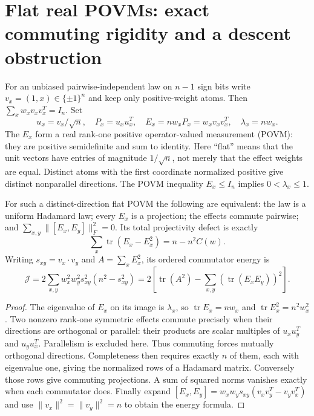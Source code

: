 \section{Flat real POVMs: exact commuting rigidity and a descent obstruction}
For an unbiased pairwise-independent law on $n-1$ sign bits write
$v_x=(1,x)\in\{\pm1\}^n$ and keep only positive-weight atoms.
Then $\sum_xw_xv_xv_x^T=I_n$. Set
\[
 u_x=v_x/\sqrt n,\quad P_x=u_xu_x^T,\quad
 E_x=nw_xP_x=w_xv_xv_x^T,\quad\lambda_x=nw_x.
\]
The $E_x$ form a real rank-one positive operator-valued measurement
(POVM): they are positive semidefinite and sum to identity.
Here ``flat'' means that the unit vectors have entries of magnitude
$1/\sqrt n$, not merely that the effect weights are equal.
Distinct atoms with the first coordinate normalized positive give
distinct nonparallel directions. The POVM inequality $E_x\le I_n$
implies $0<\lambda_x\le1$.

\begin{theorem}
For such a distinct-direction flat POVM the following are equivalent:
the law is a uniform Hadamard law; every $E_x$ is a projection;
the effects commute pairwise; and
$\sum_{x,y}\|[E_x,E_y]\|_F^2=0$.
Its total projectivity defect is exactly
\[
 \sum_x\operatorname{tr}(E_x-E_x^2)=n-n^2C(w).
\]
Writing $s_{xy}=v_x\cdot v_y$ and $A=\sum_xE_x^2$, its ordered
commutator energy is
\[
 \mathcal J=2\sum_{x,y}w_x^2w_y^2s_{xy}^2(n^2-s_{xy}^2)
 =2\left[\operatorname{tr}(A^2)-
                 \sum_{x,y}(\operatorname{tr}(E_xE_y))^2\right].
\]
\end{theorem}
\begin{proof}
The eigenvalue of $E_x$ on its image is $\lambda_x$, so
$\operatorname{tr}E_x=nw_x$ and $\operatorname{tr}E_x^2=n^2w_x^2$.
Two nonzero rank-one symmetric effects commute precisely when their
directions are orthogonal or parallel: their products are scalar
multiples of $u_xu_y^T$ and $u_yu_x^T$. Parallelism is excluded here.
Thus commuting forces mutually orthogonal directions. Completeness
then requires exactly $n$ of them, each with eigenvalue one, giving
the normalized rows of a Hadamard matrix. Conversely those rows give
commuting projections. A sum of squared norms vanishes exactly when
each commutator does. Finally expand
$[E_x,E_y]=w_xw_ys_{xy}(v_xv_y^T-v_yv_x^T)$ and use
$\|v_x\|^2=\|v_y\|^2=n$ to obtain the energy formula.
\end{proof}
